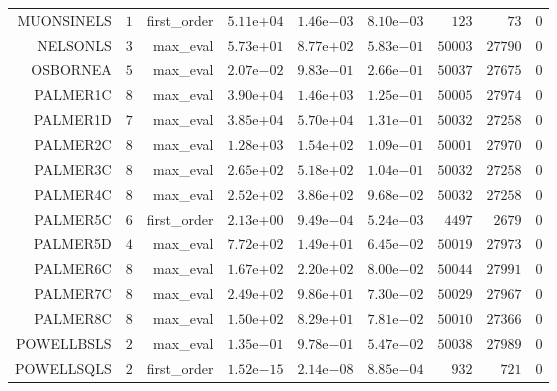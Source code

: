 \begin{longtable}{rrrrrrrrr}
MUONSINELS & \(     1\) & first\_order & \( 5.11\)e\(+04\) & \( 1.46\)e\(-03\) & \( 8.10\)e\(-03\) & \(   123\) & \(    73\) & \(     0\) \\
NELSONLS & \(     3\) & max\_eval & \( 5.73\)e\(+01\) & \( 8.77\)e\(+02\) & \( 5.83\)e\(-01\) & \( 50003\) & \( 27790\) & \(     0\) \\
OSBORNEA & \(     5\) & max\_eval & \( 2.07\)e\(-02\) & \( 9.83\)e\(-01\) & \( 2.66\)e\(-01\) & \( 50037\) & \( 27675\) & \(     0\) \\
PALMER1C & \(     8\) & max\_eval & \( 3.90\)e\(+04\) & \( 1.46\)e\(+03\) & \( 1.25\)e\(-01\) & \( 50005\) & \( 27974\) & \(     0\) \\
PALMER1D & \(     7\) & max\_eval & \( 3.85\)e\(+04\) & \( 5.70\)e\(+04\) & \( 1.31\)e\(-01\) & \( 50032\) & \( 27258\) & \(     0\) \\
PALMER2C & \(     8\) & max\_eval & \( 1.28\)e\(+03\) & \( 1.54\)e\(+02\) & \( 1.09\)e\(-01\) & \( 50001\) & \( 27970\) & \(     0\) \\
PALMER3C & \(     8\) & max\_eval & \( 2.65\)e\(+02\) & \( 5.18\)e\(+02\) & \( 1.04\)e\(-01\) & \( 50032\) & \( 27258\) & \(     0\) \\
PALMER4C & \(     8\) & max\_eval & \( 2.52\)e\(+02\) & \( 3.86\)e\(+02\) & \( 9.68\)e\(-02\) & \( 50032\) & \( 27258\) & \(     0\) \\
PALMER5C & \(     6\) & first\_order & \( 2.13\)e\(+00\) & \( 9.49\)e\(-04\) & \( 5.24\)e\(-03\) & \(  4497\) & \(  2679\) & \(     0\) \\
PALMER5D & \(     4\) & max\_eval & \( 7.72\)e\(+02\) & \( 1.49\)e\(+01\) & \( 6.45\)e\(-02\) & \( 50019\) & \( 27973\) & \(     0\) \\
PALMER6C & \(     8\) & max\_eval & \( 1.67\)e\(+02\) & \( 2.20\)e\(+02\) & \( 8.00\)e\(-02\) & \( 50044\) & \( 27991\) & \(     0\) \\
PALMER7C & \(     8\) & max\_eval & \( 2.49\)e\(+02\) & \( 9.86\)e\(+01\) & \( 7.30\)e\(-02\) & \( 50029\) & \( 27967\) & \(     0\) \\
PALMER8C & \(     8\) & max\_eval & \( 1.50\)e\(+02\) & \( 8.29\)e\(+01\) & \( 7.81\)e\(-02\) & \( 50010\) & \( 27366\) & \(     0\) \\
POWELLBSLS & \(     2\) & max\_eval & \( 1.35\)e\(-01\) & \( 9.78\)e\(-01\) & \( 5.47\)e\(-02\) & \( 50038\) & \( 27989\) & \(     0\) \\
POWELLSQLS & \(     2\) & first\_order & \( 1.52\)e\(-15\) & \( 2.14\)e\(-08\) & \( 8.85\)e\(-04\) & \(   932\) & \(   721\) & \(     0\) \\

\end{longtable}
